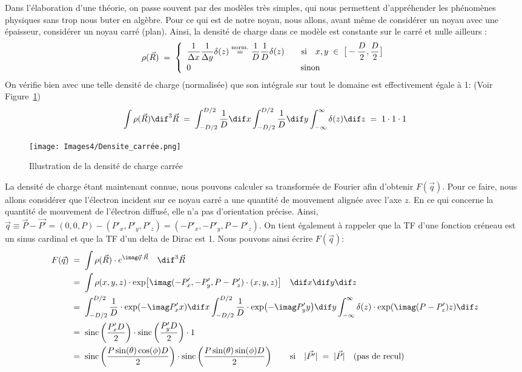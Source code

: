 Dans l'élaboration d'une théorie, on passe souvent par des modèles très simples, qui nous permettent d'appréhender les phénomènes physiques sans trop nous buter en algèbre. Pour ce qui est de notre noyau, nous allons, avant même de considérer un noyau avec une épaisseur, considérer un noyau carré (plan). Ainsi, la densité de charge dans ce modèle est constante sur le carré et nulle ailleurs :
\[
    \rho(\vec{R}) \; = \;
    \left\{
    \begin{array}{ll}
        \dfrac{1}{\Delta x} \dfrac{1}{\Delta y} \delta(z)
        \overset{\text{norm.}}= 
        \dfrac{1}{D}\dfrac{1}{D}\delta(z)
        \qquad \text{si} \quad
        x,y \;\in\; \big[ -\dfrac{D}{2},\dfrac{D}{2} \big] \\[7pt]
        0 \qquad \qquad \qquad \qquad \qquad \qquad \quad \text{sinon}
    \end{array}
    \right.
\]
On vérifie bien avec une telle densité de charge (normalisée) que son intégrale sur tout le domaine est effectivement égale à 1: (Voir Figure~\ref{fig:densite_carree})
\[
    \int \rho(\vec{R}) \dif^3\vec{R}
    \eq
    \int_{-D/2}^{D/2}\dfrac{1}{D} \dif x
    \int_{-D/2}^{D/2}\dfrac{1}{D} \dif y
    \int_{-\infty}^{\infty}\delta (z)\dif z
    \eq 1\cdot 1 \cdot 1
\]
\begin{figure}[H]
    \centering
    \texttt{[image: Images4/Densite\_carrée.png]}
    \caption{Illustration de la densité de charge carrée}
    \label{fig:densite_carree}
\end{figure}
La densité de charge étant maintenant connue, nous pouvons calculer sa transformée de Fourier afin d'obtenir $F(\vec{q})$. Pour ce faire, nous allons considérer que l'électron incident sur ce noyau carré a une quantité de mouvement alignée avec l'axe $z$. En ce qui concerne la quantité de mouvement de l'électron diffusé, elle n'a pas d'orientation précise. Ainsi, $\vec{q} \equiv \vec{P}-\vec{P'} = (0,0,P)-(P'_x,P'_y,P'_z) = (-P'_x,-P'_y,P-P'_z) $. On tient également à rappeler que la TF d'une fonction créneau est un sinus cardinal et que la TF d'un delta de Dirac est 1.
Nous pouvons ainsi écrire $F(\vec{q})$:
\begin{align*}
    F(\vec{q}) 
    &\eq
    \int \rho(\vec{R}) \cdot e^{\imag\vec{q} \cdot\vec{R}} \quad \dif^3\vec{R}\\
    &\eq
    \int \rho(x,y,z) \cdot \exp[\imag(-P'_x,-P'_y,P-P'_z) \cdot(x,y,z)] \quad \dif x\dif y\dif z\\
    &\eq
    \int_{-D/2}^{D/2}\dfrac{1}{D}     \cdot \exp(-\imag P'_xx) \dif x
    \int_{-D/2}^{D/2}\dfrac{1}{D}     \cdot \exp(-\imag P'_yy) \dif y
    \int_{-\infty}^{\infty} \delta(z) \cdot \exp(\imag (P-P'_z)z) \dif z\\
    &\eq
    \sinc\left(\dfrac{P'_xD}{2}\right) \cdot
    \sinc\left(\dfrac{P'_yD}{2}\right) \cdot 1\\
    &\eq
    \sinc\left(\dfrac{P \sin(\theta)\cos(\phi)D}{2}\right) \cdot
    \sinc\left(\dfrac{P \sin(\theta)\sin(\phi)D}{2}\right)
    \qquad \text{si} \quad |\vec{P'}|\eq|\vec{P}| \quad \text{(pas de recul)}
\end{align*}
